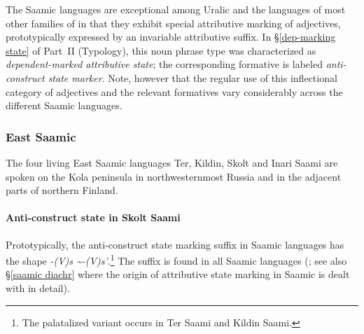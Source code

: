 The Saamic languages are exceptional among Uralic and the languages of most other families of  in that they exhibit special attributive marking of adjectives, prototypically expressed by an invariable attributive suffix. In \S\ref{dep-marking state} of Part~II (Typology), this noun phrase type was characterized as \textit{dependent\hyp{}marked attributive state}; the corresponding formative is labeled \textit{anti\hyp{}construct state marker}. Note, however that the regular use of this inflectional category of adjectives and the relevant formatives vary considerably across the different Saamic languages.

\subsubsection{East Saamic}
The four living East Saamic languages Ter, Kildin, Skolt and Inari Saami are spoken on the Kola peninsula in northwesternmost Russia and in the adjacent parts of northern Finland.

\paragraph*{Anti\hyp{}construct state in Skolt Saami}\hspace{0.4cm}
Prototypically, the anti\hyp{}construct state marking suffix in Saamic languages has the shape \textit{-(V)s \textasciitilde-(V)s'}.\footnote{The palatalized variant occurs in Ter Saami and Kildin Saami.} The suffix is found in all Saamic languages (\citealt{riesler2006b}; see also \S\ref{saamic diachr} where the origin of attributive state marking in Saamic is dealt with in detail). 


